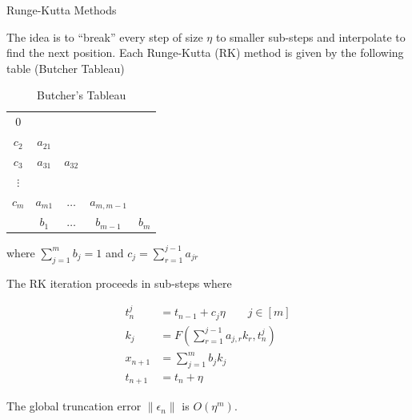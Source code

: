 \documentclass[10pt]{beamer}
\begin{document}
\begin{frame}[allowframebreaks]{Runge-Kutta Methods}

The idea is to ``break'' every step of size $\eta$ to smaller sub-steps and interpolate to find the next position. Each Runge-Kutta (RK) method is given by the following table (Butcher Tableau)

\begin{table}[]
    \centering
    \begin{tabular}{c|cccc}
        0 &  \\
        $c_2$ & $a_{21}$\\
        $c_3$ & $a_{31}$ & $a_{32}$ \\
        $\vdots$ & \\
        $c_m$ & $a_{m1}$ & $\dots$ & $a_{m,m-1}$ \\ \hline
         & $b_1$ & $\dots$ & $b_{m-1}$ & $b_m$ \\
    \end{tabular}
    \caption{Butcher's Tableau}
    \label{tab:my_label}
\end{table}

where $\sum_{j = 1}^m b_j = 1$ and $c_j = \sum_{r = 1}^{j-1} a_{jr}$

\framebreak

The RK iteration proceeds in sub-steps where

\begin{align*}
    t_{n}^j & = t_{n-1} + c_j \eta \qquad j \in [m] \\
    k_j & = F \left ( \sum_{r = 1}^{j - 1} a_{j, r} k_r , t_n^j \right ) \\
    x_{n + 1} & = \sum_{j = 1}^m b_j k_j \\
    t_{n + 1} & = t_n + \eta
\end{align*}
    
The global truncation error $\| \epsilon_n \|$ is $O(\eta^m)$.      
    
\end{frame}
\end{document}
